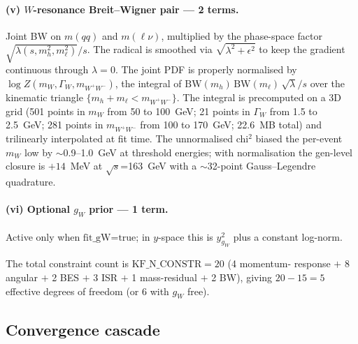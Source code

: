 \documentclass[11pt,a4paper]{article}
\newcommand{\sqs}{\ensuremath{\sqrt{s}}\xspace}
\newcommand{\WW}{\ensuremath{W^+W^-}\xspace}
\begin{document}
\paragraph{(v) $W$-resonance Breit--Wigner pair --- 2 terms.}
Joint BW on $m(qq)$ and $m(\ell\nu)$, multiplied by the phase-space
factor $\sqrt{\lambda(s, m_h^2, m_\ell^2)}/s$. The radical is smoothed
via $\sqrt{\lambda^2+\epsilon^2}$ to keep the gradient continuous
through $\lambda=0$. The joint PDF is properly normalised by
$\log Z(m_W,\Gamma_W,m_{\WW})$, the integral of
$\text{BW}(m_h)\,\text{BW}(m_\ell)\,\sqrt{\lambda}/s$ over the kinematic
triangle $\{m_h+m_\ell < m_{\WW}\}$. The integral is precomputed on a
3D grid (501 points in $m_W$ from 50 to 100~GeV; 21 points in $\Gamma_W$
from 1.5 to 2.5~GeV; 281 points in $m_{\WW}$ from 100 to 170~GeV;
22.6~MB total) and trilinearly interpolated at fit time. The unnormalised
chi$^2$ biased the per-event $m_W$ low by $\sim$0.9--1.0~GeV at threshold
energies; with normalisation the gen-level closure is $+14$~MeV at
\sqs=163~GeV with a $\sim$32-point Gauss--Legendre quadrature.

\paragraph{(vi) Optional $g_W$ prior --- 1 term.}
Active only when $\text{fit\_gW=true}$; in $y$-space this is
$y_{g_W}^2$ plus a constant log-norm.

The total constraint count is $\text{KF\_N\_CONSTR}=20$ (4 momentum-
response $+$ 8 angular $+$ 2 BES $+$ 3 ISR $+$ 1 mass-residual $+$ 2 BW),
giving $20-15 = 5$ effective degrees of freedom (or 6 with $g_W$ free).

\subsection{Convergence cascade}\label{sec:cascade}
\end{document}
